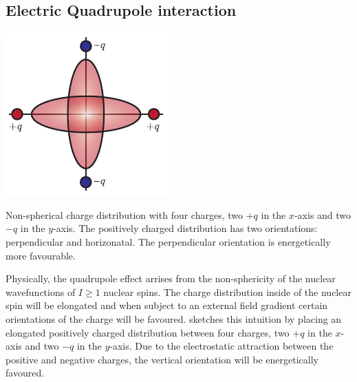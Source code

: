 \subsection{Electric Quadrupole interaction}


\begin{marginfigure}
    \includegraphics{chapter2/figures/charge_orientatons.pdf}
    \caption[Quadrupole charge diagram]{Non-spherical charge distribution with four charges, two $+q$ in the $x$-axis and two $-q$ in the $y$-axis. The positively charged distribution has two orientations: perpendicular and horizonatal. The perpendicular orientation is energetically more favourable.}
\end{marginfigure}

Physically, the quadrupole effect arrises from the non-sphericity of the nuclear wavefunctions of $I\geq1$ nuclear spins. The charge distribution inside of the nuclear spin will be elongated and when subject to an external field gradient certain orientations of the charge will be favoured.  sketches this intuition by placing an elongated positively charged distribution between four charges, two $+q$ in the $x$-axis and two $-q$ in the $y$-axis. Due to the electrostatic attraction between the positive and negative charges, the vertical orientation will be energetically favoured.

